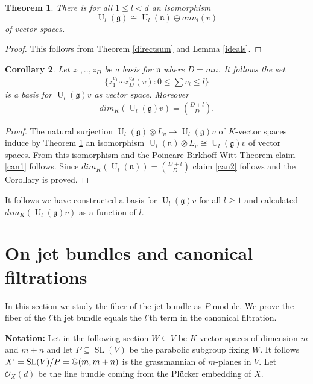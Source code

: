 \documentclass{amsart}
\theoremstyle{plain}
\newtheorem{theorem}{Theorem}[section]
\newtheorem{corollary}[theorem]{Corollary}
\theoremstyle{definition}
\theoremstyle{remark}
\numberwithin{equation}{theorem}
\begin{document}
\begin{theorem} \label{main} There is for all $1\leq l < d$ an isomorphism
\[ {\operatorname{U}}_l({\mathfrak{g}})\cong {\operatorname{U}}_l({\mathfrak{n}})\oplus ann_l(v) \]
of vector spaces.
\end{theorem}
\begin{proof} This follows from Theorem \ref{directsum} and Lemma \ref{ideals}.
\end{proof}

\begin{corollary} \label{dim} Let $z_1,..,z_D$ be a basis for ${\mathfrak{n}}$ where
  $D=mn$. It follows the set 
\begin{align} \label{can1}
 \{z_1^{v_1}\cdots z_D^{v_d}(v): 0\leq \sum v_i \leq l \} 
\end{align}
is a basis for ${\operatorname{U}}_l({\mathfrak{g}})v$ as vector space.
Moreover
\begin{align} \label{can2}
 dim_K({\operatorname{U}}_l({\mathfrak{g}})v)=\binom{D+l}{D}.
\end{align}
\end{corollary}
\begin{proof} The natural surjection ${\operatorname{U}}_l({\mathfrak{g}})\otimes L_v\rightarrow {\operatorname{U}}_l({\mathfrak{g}})v$
of $K$-vector spaces induce by Theorem \ref{main} an isomorphism
${\operatorname{U}}_l({\mathfrak{n}})\otimes L_v \cong {\operatorname{U}}_l({\mathfrak{g}})v$
of vector spaces. From this isomorphism and the Poincare-Birkhoff-Witt
Theorem  claim \ref{can1} follows. Since
$dim_K({\operatorname{U}}_l({\mathfrak{n}}))=\binom{D+l}{D}$ claim \ref{can2} follows and the
Corollary is proved.
\end{proof}

It follows we have constructed a basis for ${\operatorname{U}}_l({\mathfrak{g}})v$ for all $l\geq
1$ and calculated $dim_K({\operatorname{U}}_l({\mathfrak{g}})v)$ as a function of $l$.

\section{On  jet bundles and canonical filtrations}

In this section we study the fiber of the jet bundle as $P$-module. We
prove the fiber of the $l$'th jet bundle equals the $l$'th term in the
canonical filtration.

\textbf{Notation:} Let in the following section $W\subseteq V$ be $K$-vector spaces of
dimension $m$ and $m+n$ and let $P\subseteq {\operatorname{SL}}(V)$ be the parabolic
subgroup fixing $W$. It follows $X`={\operatorname{SL}}(V)/P={\mathbb{G} }(m,m+n)$ is the
grassmannian of $m$-planes in $V$. Let ${\mathcal{O} }_X(d)$ be the line bundle
coming from the Pl\"{u}cker embedding of $X$.
\end{document}

